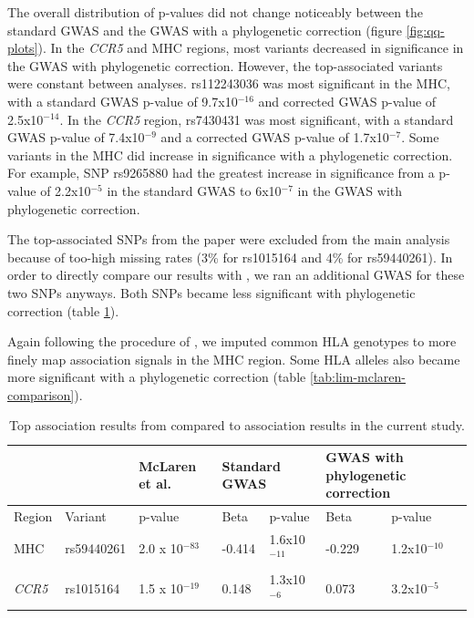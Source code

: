 \documentclass[]{article}
\begin{document}
\begin{doublespace}
The overall distribution of p-values did not change noticeably between the standard GWAS and the GWAS with a phylogenetic correction (figure \ref{fig:qq-plots}). In the \emph{CCR5} and MHC regions, most variants decreased in significance in the GWAS with phylogenetic correction. However, the top-associated variants were constant between analyses. rs112243036 was most significant in the MHC, with a standard GWAS p-value of 9.7x10$^{-16}$ and corrected GWAS p-value of 2.5x10$^{-14}$. In the \emph{CCR5} region, rs7430431 was most significant, with a standard GWAS p-value of 7.4x10$^{-9}$ and a corrected GWAS p-value of 1.7x10$^{-7}$. Some variants in the MHC did increase in significance with a phylogenetic correction. For example, SNP rs9265880 had the greatest increase in significance from a p-value of 2.2x10$^{-5}$ in the standard GWAS to 6x10$^{-7}$ in the GWAS with phylogenetic correction. 

The top-associated SNPs from the \citet{McLaren2015} paper were excluded from the main analysis because of too-high missing rates (3\% for rs1015164 and 4\% for rs59440261). In order to directly compare our results with \citet{McLaren2015}, we ran an additional GWAS for these two SNPs anyways. Both SNPs became less significant with phylogenetic correction (table \ref{tab:comp-gwas}).

Again following the procedure of \citet{McLaren2015}, we imputed common HLA genotypes to more finely map association signals in the MHC region. Some HLA alleles also became more significant with a phylogenetic correction (table \ref{tab:lim-mclaren-comparison}).

\begin{table}[H]
	\begin{center}
		\begin{tabular}{p{1cm}p{2cm}p{2.5cm}p{1cm}p{2cm}p{1cm}p{2cm}} %
			\hline
			& & McLaren et al.  & \multicolumn{2}{l}{Standard GWAS } & \multicolumn{2}{l}{GWAS with phylogenetic correction} \\ 
			\hline
			Region & Variant & p-value & Beta & p-value & Beta & p-value \\
			\hline
			MHC & rs59440261 & 2.0 x 10$^{-83}$ & -0.414 & 1.6x10$^{-11}$ & -0.229 & 1.2x10$^{-10}$ \\
			\emph{CCR5} & rs1015164 & 1.5 x 10$^{-19}$ & 0.148 & 1.3x10$^{-6}$ & 0.073 & 3.2x10$^{-5}$ \\			
			\hline
		\end{tabular}
		\caption{Top association results from \citet{McLaren2015} compared to association results in the current study.}
		\label{tab:comp-gwas}
	\end{center}
\end{table}


\end{doublespace}
\end{document}
